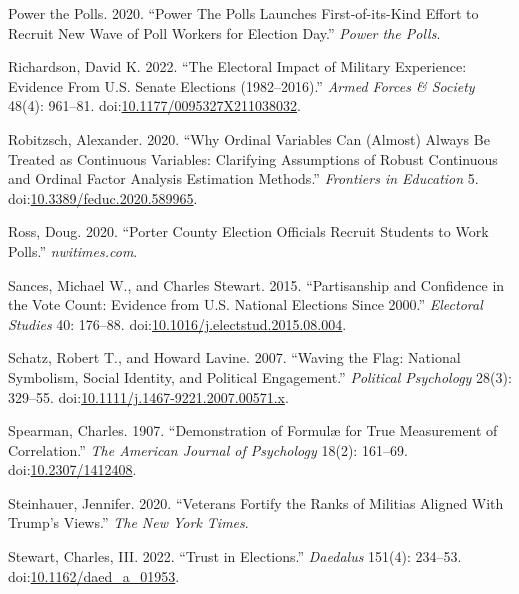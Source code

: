 \documentclass[
  12pt,
  letterpaper,
]{article}
\newlength{\cslhangindent}
\newenvironment{CSLReferences}[2] %
 {\begin{list}{}{%
  \setlength{\itemindent}{0pt}
  \setlength{\leftmargin}{0pt}
  \setlength{\parsep}{0pt}
  \ifodd #1
   \setlength{\leftmargin}{\cslhangindent}
   \setlength{\itemindent}{-1\cslhangindent}
  \fi
  \setlength{\itemsep}{#2\baselineskip}}}
 {\end{list}}
\begin{document}
\begin{CSLReferences}{1}{1}
Power the Polls. 2020. {``Power {The Polls Launches First-of-its-Kind
Effort} to {Recruit New Wave} of {Poll Workers} for {Election Day}.''}
\emph{Power the Polls}.

Richardson, David K. 2022. {``The {Electoral Impact} of {Military
Experience}: {Evidence From U}.{S}. {Senate Elections} (1982--2016).''}
\emph{Armed Forces \& Society} 48(4): 961--81.
doi:\href{https://doi.org/10.1177/0095327X211038032}{10.1177/0095327X211038032}.

Robitzsch, Alexander. 2020. {``Why {Ordinal Variables Can} ({Almost})
{Always Be Treated} as {Continuous Variables}: {Clarifying Assumptions}
of {Robust Continuous} and {Ordinal Factor Analysis Estimation
Methods}.''} \emph{Frontiers in Education} 5.
doi:\href{https://doi.org/10.3389/feduc.2020.589965}{10.3389/feduc.2020.589965}.

Ross, Doug. 2020. {``Porter {County} Election Officials Recruit Students
to Work Polls.''} \emph{nwitimes.com}.

Sances, Michael W., and Charles Stewart. 2015. {``Partisanship and
Confidence in the Vote Count: {Evidence} from {U}.{S}. National
Elections Since 2000.''} \emph{Electoral Studies} 40: 176--88.
doi:\href{https://doi.org/10.1016/j.electstud.2015.08.004}{10.1016/j.electstud.2015.08.004}.

Schatz, Robert T., and Howard Lavine. 2007. {``Waving the {Flag}:
{National Symbolism}, {Social Identity}, and {Political Engagement}.''}
\emph{Political Psychology} 28(3): 329--55.
doi:\href{https://doi.org/10.1111/j.1467-9221.2007.00571.x}{10.1111/j.1467-9221.2007.00571.x}.

Spearman, Charles. 1907. {``Demonstration of {Formul{æ}} for {True
Measurement} of {Correlation}.''} \emph{The American Journal of
Psychology} 18(2): 161--69.
doi:\href{https://doi.org/10.2307/1412408}{10.2307/1412408}.

Steinhauer, Jennifer. 2020. {``Veterans {Fortify} the {Ranks} of
{Militias Aligned With Trump}'s {Views}.''} \emph{The New York Times}.

Stewart, Charles, III. 2022. {``Trust in {Elections}.''} \emph{Daedalus}
151(4): 234--53.
doi:\href{https://doi.org/10.1162/daed_a_01953}{10.1162/daed\_a\_01953}.


\end{CSLReferences}
\end{document}
